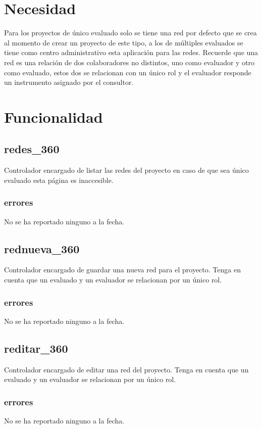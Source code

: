 \documentclass[10pt,a4paper]{book}
\begin{document}
	\section{Necesidad}

	Para los proyectos de único evaluado solo se tiene una red por defecto que se crea al momento de crear un proyecto de este tipo, a los de múltiples evaluados se tiene como centro administrativo esta aplicación para las redes. Recuerde que una red es una relación de dos colaboradores no distintos, uno como evaluador y otro como evaluado, estos dos se relacionan con un único rol y el evaluador responde un instrumento asignado por el consultor.

	\section{Funcionalidad}

	\subsection{redes\_360}
	Controlador encargado de listar las redes del proyecto en caso de que sea único evaluado esta página es inaccesible.
	\subsubsection{errores}
	No se ha reportado ninguno a la fecha.

	\subsection{rednueva\_360}
	Controlador encargado de guardar una nueva red para el proyecto. Tenga en cuenta que un evaluado y un evaluador se relacionan por un único rol.
	\subsubsection{errores}
	No se ha reportado ninguno a la fecha.

	\subsection{reditar\_360}
	Controlador encargado de editar una red del proyecto. Tenga en cuenta que un evaluado y un evaluador se relacionan por un único rol.
	\subsubsection{errores}
	No se ha reportado ninguno a la fecha.
\end{document}
